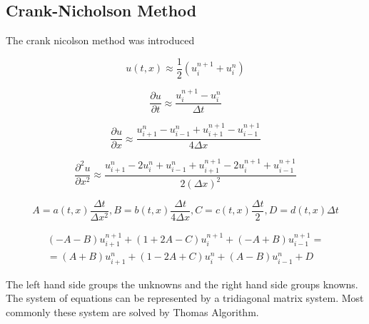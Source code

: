 \documentclass[12pt, oneside]{book}
\theoremstyle{plain}
\theoremstyle{definition}
\begin{document}
\subsection{Crank-Nicholson Method}
The crank nicolson method was introduced \cite{cn}

$$ u(t,x) \approx \frac{1}{2} ( u^{n+1}_i +  u^n_i) $$

$$   \frac{\partial u}{\partial t} \approx \frac{u^{n+1}_i - u^n_i}{\Delta t} $$

$$   \frac{\partial u}{\partial x} \approx \frac{u^n_{i+1} - u^n_{i-1} + u^{n+1}_{i+1} - u^{n+1}_{i-1}}{4\Delta x} $$

$$ \frac{\partial^2 u}{\partial x^2} \approx \frac{u^n_{i+1}- 2u^n_i + u^n_{i-1} + u^{n+1}_{i+1}- 2u^{n+1}_i + u^{n+1}_{i-1}}{2(\Delta x)^2} $$

$$ A = a(t,x) \frac{\Delta t}{\Delta x^2},  B = b(t,x) \frac{\Delta t}{4\Delta x}, C = c(t,x) \frac{\Delta t}{2},  D = d(t,x) \Delta t $$ 



\begin{multline}
 (-A -B) u^{n+1}_{i+1} + (1 + 2A - C) u^{n+1}_i + (-A + B) u^{n+1}_{i-1} =  \\
=  (A+B) u^{n}_{i+1} + (1 - 2A + C) u^{n}_i + (A - B) u^{n}_{i-1} + D
\end{multline}





The left hand side groups the unknowns and the right hand side groups knowns. The system of equations can be represented by a tridiagonal matrix system. Most commonly these system are solved by Thomas Algorithm.
\end{document}

